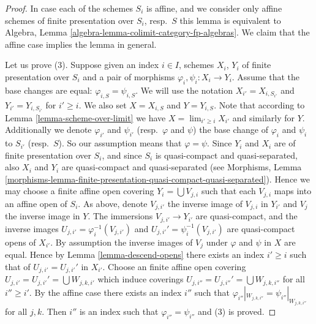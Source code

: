 \begin{proof}
In case each of the schemes $S_i$ is affine, and we consider
only affine schemes of finite presentation over $S_i$, resp.\ $S$
this lemma is equivalent to
Algebra, Lemma \ref{algebra-lemma-colimit-category-fp-algebras}.
We claim that the affine case implies the lemma in general.

\medskip\noindent
Let us prove (3). Suppose given an index $i \in I$, schemes
$X_i$, $Y_i$ of finite presentation over $S_i$ and a pair of morphisms
$\varphi_i, \psi_i : X_i \to Y_i$. Assume that the base changes are
equal: $\varphi_{i, S} = \psi_{i, S}$. We will use the notation
$X_{i'} = X_{i, S_{i'}}$ and $Y_{i'} = Y_{i, S_{i'}}$ for
$i' \geq i$. We also set $X = X_{i, S}$ and $Y = Y_{i, S}$.
Note that according to Lemma \ref{lemma-scheme-over-limit} we have
$X = \lim_{i' \geq i} X_{i'}$ and similarly for $Y$.
Additionally we denote $\varphi_{i'}$ and $\psi_{i'}$
(resp.\ $\varphi$ and $\psi$)
the base change of $\varphi_i$ and $\psi_i$ to $S_{i'}$
(resp.\ $S$). So our assumption means that $\varphi = \psi$.
Since $Y_i$ and $X_i$ are of finite presentation
over $S_i$, and since $S_i$ is quasi-compact and quasi-separated, also
$X_i$ and $Y_i$ are quasi-compact and quasi-separated
(see Morphisms,
Lemma \ref{morphisms-lemma-finite-presentation-quasi-compact-quasi-separated}).
Hence we may choose a finite affine open covering
$Y_i = \bigcup V_{j, i}$ such that each $V_{j, i}$ maps into
an affine open of $S_i$. As above, denote $V_{j, i'}$ the inverse
image of $V_{j, i}$ in $Y_{i'}$ and $V_j$ the inverse image in $Y$.
The immersions $V_{j, i'} \to Y_{i'}$ are quasi-compact, and the inverse images
$U_{j, i'} = \varphi_i^{-1}(V_{j, i'})$ and
$U_{j, i'}' = \psi_i^{-1}(V_{j, i'})$
are quasi-compact opens of $X_{i'}$. By assumption the inverse images of
$V_j$ under $\varphi$ and $\psi$ in $X$ are equal.
Hence by Lemma \ref{lemma-descend-opens}
there exists an index $i' \geq i$ such that
of $U_{j, i'} = U_{j, i'}'$ in $X_{i'}$.
Choose an finite affine open covering
$U_{j, i'} = U_{j, i'}' = \bigcup W_{j, k, i'}$
which induce coverings $U_{j, i''} = U_{j, i''}' = \bigcup W_{j, k, i''}$
for all $i'' \geq i'$.
By the affine case there exists
an index $i''$ such that
$\varphi_{i''}|_{W_{j, k, i''}} = \psi_{i''}|_{W_{j, k, i''}}$
for all $j, k$. Then $i''$ is an index such that
$\varphi_{i''} = \psi_{i''}$ and (3) is proved.


\end{proof}
